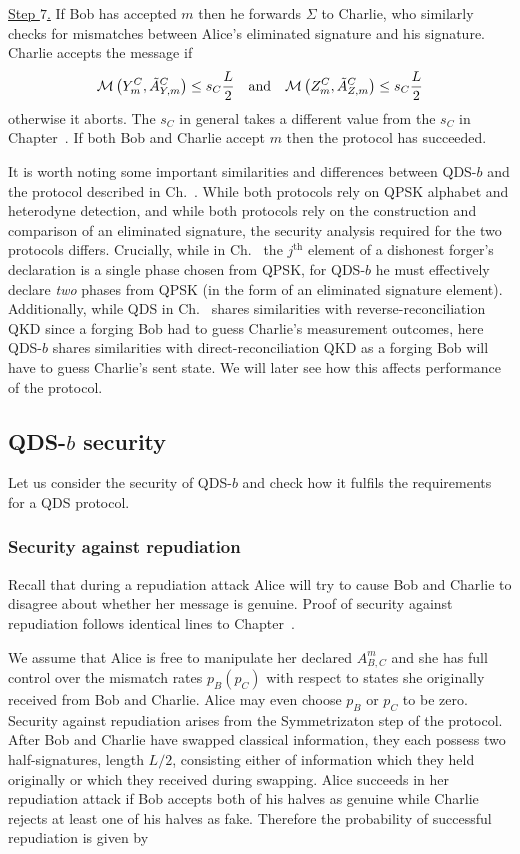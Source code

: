 \noindent \underline{Step $7$.} If Bob has accepted $m$ then he forwards $\Sigma$ to Charlie, who similarly checks for mismatches between Alice's eliminated signature and his signature. Charlie accepts the message if
\begin{equation}
\mathcal{M}\left(Y_m^C, \tilde{A}_{Y, m}^C\right) \le s_C \frac{L}{2} \qq{and} \mathcal{M}\left(Z_m^C, \tilde{A}_{Z, m}^C\right) \le s_C \frac{L}{2}
\end{equation}
otherwise it aborts. The $s_C$ in general takes a different value from the $s_C$ in Chapter~. If both Bob and Charlie accept $m$ then the protocol has succeeded. 

It is worth noting some important similarities and differences between QDS-$b$ and the protocol described in Ch.~. While both protocols rely on QPSK alphabet and heterodyne detection, and while both protocols rely on the construction and comparison of an eliminated signature, the security analysis required for the two protocols differs. Crucially, while in Ch.~ the $j^{\text{th}}$ element of a dishonest forger's declaration is a single phase chosen from QPSK, for QDS-$b$ he must effectively declare \emph{two} phases from QPSK (in the form of an eliminated signature element). Additionally, while QDS in Ch.~ shares similarities with reverse-reconciliation QKD since a forging Bob had to guess Charlie's measurement outcomes, here QDS-$b$ shares similarities with direct-reconciliation QKD as a forging Bob will have to guess Charlie's sent state. We will later see how this affects performance of the protocol.

\subsection{QDS-$b$ security}
Let us consider the security of QDS-$b$ and check how it fulfils the requirements for a QDS protocol. 
\subsubsection{Security against repudiation}
Recall that during a repudiation attack Alice will try to cause Bob and Charlie to disagree about whether her message is genuine. Proof of security against repudiation follows identical lines to Chapter~.

We assume that Alice is free to manipulate her declared $A_{B, C}^m$ and she has full control over the mismatch rates $p_B \left(p_C\right)$ with respect to states she originally received from Bob and Charlie. Alice may even choose $p_B$ or $p_C$ to be zero. Security against repudiation arises from the Symmetrizaton step of the protocol. After Bob and Charlie have swapped classical information, they each possess two half-signatures, length $L/2$, consisting either of information which they held originally or which they received during swapping. Alice succeeds in her repudiation attack if Bob accepts both of his halves as genuine while Charlie rejects at least one of his halves as fake. Therefore the probability of successful repudiation is given by

